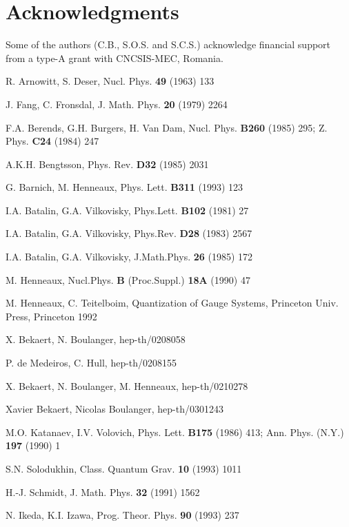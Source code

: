 \documentclass[a4paper,12pt]{article}
\begin{document}
\section*{Acknowledgments}

Some of the authors (C.B., S.O.S. and S.C.S.) acknowledge
financial support from a type-A grant with CNCSIS-MEC, Romania.

\begin{thebibliography}{99}
  R. Arnowitt, S. Deser, Nucl. Phys. \textbf{49} (1963) 133

  J. Fang, C. Fronsdal, J. Math. Phys. \textbf{20} (1979)
2264

  F.A. Berends, G.H. Burgers, H. Van Dam, Nucl. Phys. \textbf{%
B260} (1985) 295; Z. Phys. \textbf{C24} (1984) 247

  A.K.H. Bengtsson, Phys. Rev. \textbf{D32} (1985) 2031

  G. Barnich, M. Henneaux, Phys. Lett. \textbf{B311} (1993) 123

  I.A. Batalin, G.A. Vilkovisky, Phys.Lett. \textbf{B102} (1981)
27

  I.A. Batalin, G.A. Vilkovisky, Phys.Rev. \textbf{D28} (1983)
2567

  I.A. Batalin, G.A. Vilkovisky, J.Math.Phys. \textbf{26} (1985)
172

  M. Henneaux, Nucl.Phys. \textbf{B }(Proc.Suppl.) \textbf{18A}
(1990) 47

  M. Henneaux, C. Teitelboim, Quantization of Gauge Systems,
Princeton Univ. Press, Princeton 1992

  X. Bekaert, N. Boulanger, hep-th/0208058

  P. de Medeiros, C. Hull, hep-th/0208155

  X. Bekaert, N. Boulanger, M. Henneaux, hep-th/0210278

 Xavier Bekaert, Nicolas Boulanger, hep-th/0301243

  M.O. Katanaev, I.V. Volovich, Phys. Lett. \textbf{B175}
(1986) 413; Ann. Phys. (N.Y.) \textbf{197} (1990) 1

  S.N. Solodukhin, Class. Quantum Grav. \textbf{10} (1993) 1011

  H.-J. Schmidt, J. Math. Phys. \textbf{32} (1991) 1562

  N. Ikeda, K.I. Izawa, Prog. Theor. Phys. \textbf{90} (1993)
237


\end{thebibliography}
\end{document}
